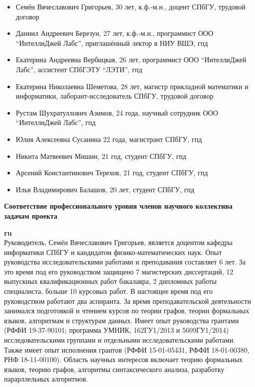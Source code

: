 \documentclass[12pt]{article}  %
\theoremstyle{remark}
\begin{document}
\begin{itemize}
  \item Семён Вячеславович Григорьев, 30 лет, к.ф.-м.н., доцент СПбГУ, трудовой договор
  \item Даниил Андреевич Березун, 27 лет, к.ф.-м.н., программист ООО ``ИнтеллиДжей Лабс'', приглашённый лектор в НИУ ВШЭ, гпд
  \item Екатерина Андреевна Вербицкая, 26 лет, программист ООО ``ИнтеллиДжей Лабс'', ассистент СПбГЭТУ ``ЛЭТИ'', гпд
  \item Екатерина Николаевна Шеметова, 28 лет, магистр прикладной математики и информатики, лаборант-исследователь СПбГУ, трудовой договор
  \item Рустам Шухратуллович Азимов, 24 года, научный сотрудник ООО ``ИнтеллиДжей Лабс'', гпд
  \item Юлия Алексеевна Сусанина 22 года, магистрант СПбГУ, гпд
  \item Никита Матвеевич Мишин, 21 год, студент СПбГУ, гпд
  \item Арсений Константинович Терехов, 21 год, студент СПбГУ, гпд
  \item Илья Владимирович Балашов, 20 лет, студент СПбГУ, гпд
\end{itemize}



\textbf{Соответствие профессионального уровня членов научного коллектива задачам проекта}

\textbf{ru}\\
%
Руководитель, Семён Вячеславович Григорьев, является доцентом кафедры информатики СПбГУ и кандидатом физико-математических наук.
Опыт руководства исследовательскими работами и преподавания составляет 6 лет.
За это время под его руководством защищено 7 магистерских диссертаций, 12 выпускных квалификационных работ бакалавра, 2 дипломных работы специалиста, больше 10 курсовых работ.
В настоящее время под его руководством работают два аспиранта.
За время преподавательской деятельности занимался подготовкой и чтением курсов по теории графов, теории формальных языков, алгоритмам и структурам данных.
Имеет опыт руководства грантами (РФФИ 19-37-90101; программа УМНИК, 162ГУ1/2013 и 5609ГУ1/2014) исследовательскими группами и отдельными исследовательскими работами.
Также имеет опыт исполнения грантов (РФФИ 15-01-05431, РФФИ 18-01-00380, РНФ 18-11-00100).
Область научных интересов включает теорию формальных языков, теорию графов, алгоритмы синтаксического анализа, разработку парарллельных алгоритмов.
\end{document}
